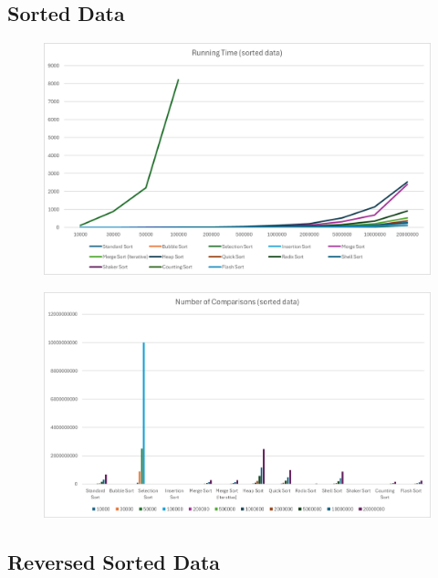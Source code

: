 \documentclass{article}
\begin{document}
\pagebreak


\subsection{Sorted Data}

\begin{figure}[ht]
	\centering
	\includegraphics[width=14cm]{images/time_sorted.png}
\end{figure}

\begin{figure}[ht]
	\centering
	\includegraphics[width=14cm]{images/comp_sorted.png}
\end{figure}


\pagebreak


\subsection{Reversed Sorted Data}
\end{document}
